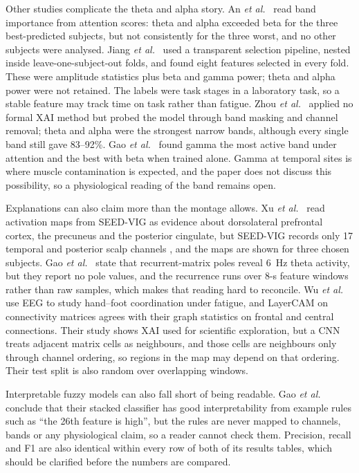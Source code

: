Other studies complicate the theta and alpha story. An \textit{et al.}~\cite{an2024attention} read band importance from attention scores: theta and alpha exceeded beta for the three best-predicted subjects, but not consistently for the three worst, and no other subjects were analysed. Jiang \textit{et al.}~\cite{jiang2026eeg} used a transparent selection pipeline, nested inside leave-one-subject-out folds, and found eight features selected in every fold. These were amplitude statistics plus beta and gamma power; theta and alpha power were not retained. The labels were task stages in a laboratory task, so a stable feature may track time on task rather than fatigue. Zhou \textit{et al.}~\cite{zhou2026sedriven} applied no formal XAI method but probed the model through band masking and channel removal; theta and alpha were the strongest narrow bands, although every single band still gave 83--92\%. Gao \textit{et al.}~\cite{gao2024sftnet} found gamma the most active band under attention and the best with beta when trained alone. Gamma at temporal sites is where muscle contamination is expected, and the paper does not discuss this possibility, so a physiological reading of the band remains open.

Explanations can also claim more than the montage allows. Xu \textit{et al.}~\cite{xu2026dynamic} read activation maps from SEED-VIG as evidence about dorsolateral prefrontal cortex, the precuneus and the posterior cingulate, but SEED-VIG records only 17 temporal and posterior scalp channels \cite{zheng2017multimodal}, and the maps are shown for three chosen subjects. Gao \textit{et al.}~\cite{gao2025idsrn} state that recurrent-matrix poles reveal 6~Hz theta activity, but they report no pole values, and the recurrence runs over 8-s feature windows rather than raw samples, which makes that reading hard to reconcile. Wu \textit{et al.}~\cite{wu2024driver} use EEG to study hand--foot coordination under fatigue, and LayerCAM on connectivity matrices agrees with their graph statistics on frontal and central connections. Their study shows XAI used for scientific exploration, but a CNN treats adjacent matrix cells as neighbours, and those cells are neighbours only through channel ordering, so regions in the map may depend on that ordering. Their test split is also random over overlapping windows.

Interpretable fuzzy models can also fall short of being readable. Gao \textit{et al.}~\cite{gao2025comprehensive} conclude that their stacked classifier has good interpretability from example rules such as ``the 26th feature is high'', but the rules are never mapped to channels, bands or any physiological claim, so a reader cannot check them. Precision, recall and F1 are also identical within every row of both of its results tables, which should be clarified before the numbers are compared.

